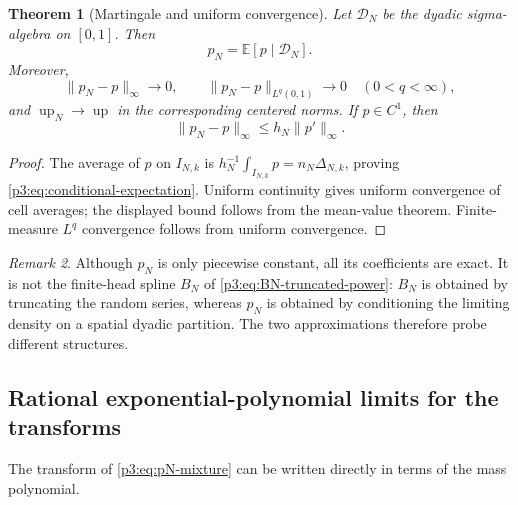 \documentclass[11pt]{article}
\newtheorem{theorem}{Theorem}[section]
\theoremstyle{definition}
\theoremstyle{remark}
\newtheorem{remark}[theorem]{Remark}
\newcommand{\E}{\mathbb E}
\newcommand{\Up}{\operatorname{up}}
\begin{document}
\begin{theorem}[Martingale and uniform convergence]
\label{p3:thm:martingale-convergence}
Let $\mathcal D_N$ be the dyadic sigma-algebra on $[0,1]$.  Then
\begin{equation}\label{p3:eq:conditional-expectation}
 p_N=\E[p\mid\mathcal D_N].
\end{equation}
Moreover,
\begin{equation}\label{p3:eq:pN-uniform}
 \|p_N-p\|_\infty\longrightarrow0,
 \qquad
 \|p_N-p\|_{L^q(0,1)}\longrightarrow0
 \quad(0<q<\infty),
\end{equation}
and $\Up_N\to\Up$ in the corresponding centered norms.
If $p\in C^1$, then
\begin{equation}\label{p3:eq:pN-simple-rate}
 \|p_N-p\|_\infty\le h_N\|p'\|_\infty.
\end{equation}
\end{theorem}

\begin{proof}
The average of $p$ on $I_{N,k}$ is
$h_N^{-1}\int_{I_{N,k}}p=n_N\Delta_{N,k}$, proving
\eqref{p3:eq:conditional-expectation}.  Uniform continuity gives uniform
convergence of cell averages; the displayed bound follows from the mean-value
theorem.  Finite-measure $L^q$ convergence follows from uniform convergence.
\end{proof}

\begin{remark}
Although $p_N$ is only piecewise constant, all its coefficients are exact.  It
is not the finite-head spline $B_N$ of \eqref{p3:eq:BN-truncated-power}: $B_N$ is
obtained by truncating the random series, whereas $p_N$ is obtained by
conditioning the limiting density on a spatial dyadic partition.  The two
approximations therefore probe different structures.
\end{remark}

\subsection{Rational exponential-polynomial limits for the transforms}

The transform of \eqref{p3:eq:pN-mixture} can be written directly in terms of the
mass polynomial.
\end{document}
